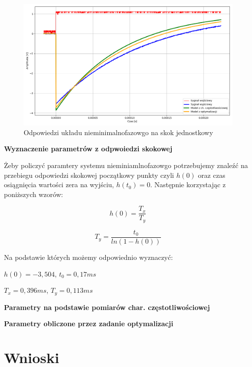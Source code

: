 \documentclass[12pt,a4paper]{article}
\begin{document}
	\begin{figure}[H]
		\centering
		\includegraphics[width=1\linewidth]{zdjecia/odp_skok_nmf.png}
		\caption{Odpowiedzi układu nieminimalnofazowgo na skok jednostkowy}
		\label{fig:skok_uk_nmf}
	\end{figure}
	
	\textbf{Wyznaczenie parametrów z odpwoiedzi skokowej}
	
	Żeby policzyć paramtery systemu nieminiamlnofazowgo potrzebujemy znaleźć na przebiegu odpowiedzi skokowej 
	początkowy punkty czyli $h(0)$ oraz czas osiągnięcia wartości zera na wyjściu, $h(t_0) = 0$. Następnie korzystając z poniższych wzorów:
	
	\begin{equation}
		h(0) = \frac{T_x}{T_y}
	\end{equation}
	
	\begin{equation}
		T_y = \frac{t_0}{ln(1-h(0))}
	\end{equation}
	
	Na podstawie których możemy odpowiednio wyznaczyć:
	
	\centering
	$h(0) = -3,504$,
	$t_0 = 0,17ms$
	
	$T_x = 0,396ms$,
	$T_y = 0,113ms$
	
	\textbf{Parametry na podstawie pomiarów char. częstotliwościowej}
	
	\textbf{Parametry obliczone przez zadanie optymalizacji}
	
	\section{Wnioski}
\end{document}

